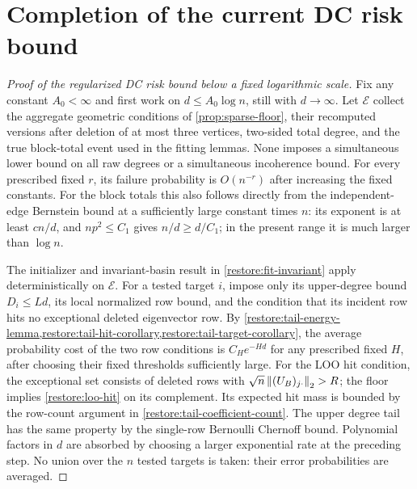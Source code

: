 \section{Completion of the current DC risk bound}
\begin{proof}[Proof of the regularized DC risk bound below a fixed logarithmic scale]
Fix any constant $A_0<\infty$ and first work on
$d\le A_0\log n$, still with $d\to\infty$.
Let $\mathcal E$ collect the aggregate geometric conditions of
\cref{prop:sparse-floor}, their recomputed versions after deletion of
at most three vertices, two-sided total degree, and the true block-total event used
in the fitting lemmas. None imposes a simultaneous lower bound on all
raw degrees or a simultaneous incoherence bound. For every prescribed
fixed $r$, its failure probability is $O(n^{-r})$ after increasing the
fixed constants. For the block totals this also follows directly from
the independent-edge Bernstein bound at a sufficiently large constant
times $n$: its exponent is at least $cn/d$, and $np^2\le C_1$ gives
$n/d\ge d/C_1$; in the present range it is much larger than $\log n$.

The initializer and invariant-basin result in
\cref{restore:fit-invariant} apply deterministically on $\mathcal E$.
For a tested target $i$, impose only its upper-degree bound
$D_i\le Ld$, its local normalized row bound, and the condition that its
incident row hits no exceptional deleted eigenvector row. By
\cref{restore:tail-energy-lemma,restore:tail-hit-corollary,restore:tail-target-corollary}, the average probability cost
of the two row conditions is $C_He^{-Hd}$ for any prescribed fixed $H$,
after choosing their fixed thresholds sufficiently large. For the
LOO hit condition, the exceptional set consists of deleted rows with
$\sqrt n\left\lVert(U_B)_{j\cdot}\right\rVert_2>R$; the floor implies
\eqref{restore:loo-hit} on its complement. Its expected hit mass
is bounded by the row-count argument in
\eqref{restore:tail-coefficient-count}.
The upper
degree tail has the same property by the single-row Bernoulli Chernoff
bound. Polynomial factors in $d$ are absorbed by choosing a larger
exponential rate at the preceding step. No union over the $n$ tested
targets is taken: their error probabilities are averaged.


\end{proof}
